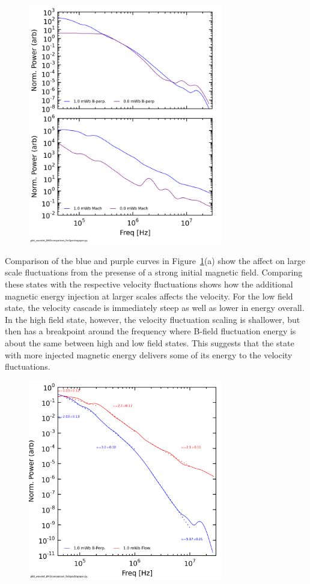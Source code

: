 \documentclass[aip,prl,amsmath,amssymb,reprint,superscriptaddress]{revtex4-1} %
\begin{document}
\begin{figure}[!htbp]
\centerline{
\includegraphics[width=8.5cm]{BvsFlowspec_2fluxes_separateplots_40t60us}}
\caption{\label{fig:BvsFlow}}
\end{figure}

Comparison of the blue and purple curves in Figure~\ref{fig:BvsFlow}(a) show the affect on large scale fluctuations from the presense of a strong initial magnetic field. Comparing these states with the respective velocity fluctuations shows how the additional magnetic energy injection at larger scales affects the velocity. For the low field state, the velocity cascade is immediately steep as well as lower in energy overall. In the high field state, however, the velocity fluctuation scaling is shallower, but then has a breakpoint around the frequency where B-field fluctuation energy is about the same between high and low field states. This suggests that the state with more injected magnetic energy delivers some of its energy to the velocity fluctuations.

\begin{figure}[!htbp]
\centerline{
\includegraphics[width=8.5cm]{BvsFlowspec_wFits_40t60us}}
\caption{\label{fig:BvsFlow_wFits}}
\end{figure}
\end{document}
